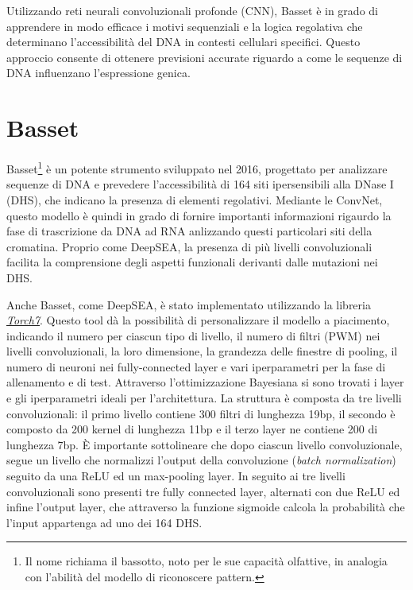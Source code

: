 Utilizzando reti neurali convoluzionali profonde (CNN), Basset è in grado di apprendere in modo efficace i motivi sequenziali e la logica regolativa che determinano l'accessibilità del DNA in contesti cellulari specifici. Questo approccio consente di ottenere previsioni accurate riguardo a come le sequenze di DNA influenzano l'espressione genica.


\section{Basset}\label{sec:Basset}
% 
Basset\footnote{Il nome richiama il bassotto, noto per le sue capacità olfattive, in analogia con l'abilità del modello di riconoscere pattern.} è un potente strumento sviluppato nel 2016, progettato per analizzare sequenze di DNA e prevedere l'accessibilità di 164 siti ipersensibili alla DNase I (\acs{DHS}), che indicano la presenza di elementi regolativi. Mediante le \acs{ConvNet}, questo modello è quindi in grado di fornire importanti informazioni rigaurdo la fase di trascrizione da \acs{DNA} ad \acs{RNA} anlizzando questi particolari siti della cromatina. Proprio come DeepSEA, la presenza di più livelli convoluzionali facilita la comprensione degli aspetti funzionali derivanti dalle mutazioni nei \acs{DHS}.

Anche Basset, come DeepSEA, è stato implementato utilizzando la libreria \href{https://github.com/torch/torch7}{\textsl{Torch7}}. Questo tool dà la possibilità di personalizzare il modello a piacimento, indicando il numero per ciascun tipo di livello, il numero di filtri (\acs{PWM}) nei livelli convoluzionali, la loro dimensione, la grandezza delle finestre di pooling, il numero di neuroni nei fully-connected layer e vari iperparametri per la fase di allenamento e di test. Attraverso l'ottimizzazione Bayesiana si sono trovati i layer e gli iperparametri ideali per l'architettura. La struttura è composta da tre livelli convoluzionali: il primo livello contiene 300 filtri di lunghezza 19bp, il secondo è composto da 200 kernel di lunghezza 11bp e il terzo layer ne contiene 200 di lunghezza 7bp. È importante sottolineare che dopo ciascun livello convoluzionale, segue un livello che normalizzi l'output della convoluzione (\textit{batch normalization}) seguito da una \acs{ReLU} ed un max-pooling layer. In seguito ai tre livelli convoluzionali sono presenti tre fully connected layer, alternati con due \acs{ReLU} ed infine l'output layer, che attraverso la funzione sigmoide calcola la probabilità che l'input appartenga ad uno dei 164 \acs{DHS}.

